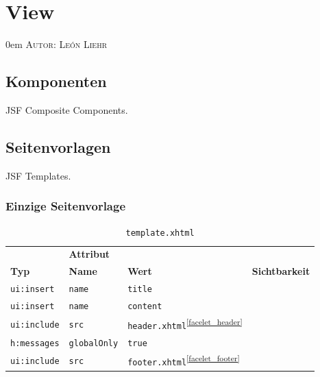 \documentclass{article}
\makeatletter
\newcommand{\sectionauthor}[1]{
	{\parindent 0em \large \scshape Autor: #1 \par \nobreak \vspace*{1em}}
	\@afterheading
}
\makeatother
\begin{document}








\section{View}
\sectionauthor{León Liehr}

\newcommand{\M}[1]{\texttt{#1}} %
\newcommand{\tag}[2]{\M{#1:#2}} %
\newcommand{\B}[1]{\#\{#1\}} %
\newcommand{\MB}[1]{\M{\B{#1}}} %

\subsection{Komponenten}

JSF Composite Components.

\subsection{Seitenvorlagen}

JSF Templates.

\subsubsection{Einzige Seitenvorlage}

\begin{table}[H]
    \centering
    \begin{tabular}{ l l l l }
        \toprule
        & \multicolumn{2}{l}{\textbf{Attribut}} &\\
        \cmidrule(r){2-3}
        \textbf{Typ} & \textbf{Name} & \textbf{Wert} & \textbf{Sichtbarkeit}\\
        \midrule
        \tag{ui}{insert} & \M{name} & \M{title} & \\
        \tag{ui}{insert} & \M{name} & \M{content} & \\
        \tag{ui}{include} & \M{src} & \M{header.xhtml}\textsuperscript{\ref{facelet_header}} & \\
        \tag{h}{messages} & \M{globalOnly} & \M{true} & \\
        \tag{ui}{include} & \M{src} & \M{footer.xhtml}\textsuperscript{\ref{facelet_footer}} & \\
        \bottomrule
    \end{tabular}
    \caption{\M{template.xhtml}}
\end{table}
\end{document}
